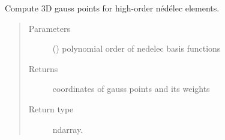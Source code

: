 \documentclass[letterpaper,10pt,english]{sphinxmanual}
\begin{document}

\begin{fulllineitems}
\label{\detokenize{petgem/hvfem:petgem.hvfem.compute3DGaussPoints}}
Compute 3D gauss points for high-order nédélec elements.
\begin{quote}\begin{description}
\item[{Parameters}] \leavevmode
{} () \textendash{} polynomial order of nedelec basis functions

\item[{Returns}] \leavevmode
coordinates of gauss points and its weights

\item[{Return type}] \leavevmode
ndarray.

\end{description}\end{quote}

\end{fulllineitems}

\end{document}
